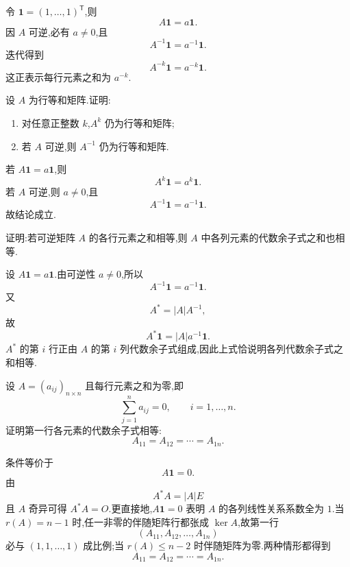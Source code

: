 \begin{solution}
令 $\boldsymbol{1}=(1,\ldots,1)^{\mathsf T}$,则
\[
A\boldsymbol{1}=a\boldsymbol{1}.
\]
因 $A$ 可逆,必有 $a\neq0$,且
\[
A^{-1}\boldsymbol{1}=a^{-1}\boldsymbol{1}.
\]
迭代得到
\[
A^{-k}\boldsymbol{1}=a^{-k}\boldsymbol{1}.
\]
这正表示每行元素之和为 $a^{-k}$.
\end{solution}

\begin{example}
设 $A$ 为行等和矩阵.证明:
\begin{enumerate}
  \item 对任意正整数 $k$,$A^k$ 仍为行等和矩阵;
  \item 若 $A$ 可逆,则 $A^{-1}$ 仍为行等和矩阵.
\end{enumerate}
\end{example}
\exampleblank

\begin{solution}
若 $A\boldsymbol{1}=a\boldsymbol{1}$,则
\[
A^k\boldsymbol{1}=a^k\boldsymbol{1}.
\]
若 $A$ 可逆,则 $a\neq0$,且
\[
A^{-1}\boldsymbol{1}=a^{-1}\boldsymbol{1}.
\]
故结论成立.
\end{solution}

\begin{example}
证明:若可逆矩阵 $A$ 的各行元素之和相等,则 $A$ 中各列元素的代数余子式之和也相等.
\end{example}
\exampleblank

\begin{solution}
设 $A\boldsymbol{1}=a\boldsymbol{1}$.由可逆性 $a\neq0$,所以
\[
A^{-1}\boldsymbol{1}=a^{-1}\boldsymbol{1}.
\]
又
\[
A^*=|A|A^{-1},
\]
故
\[
A^*\boldsymbol{1}=|A|a^{-1}\boldsymbol{1}.
\]
$A^*$ 的第 $i$ 行正由 $A$ 的第 $i$ 列代数余子式组成,因此上式恰说明各列代数余子式之和相等.
\end{solution}

\begin{example}
设 $A=(a_{ij})_{n\times n}$ 且每行元素之和为零,即
\[
\displaystyle\sum\limits_{j=1}^na_{ij}=0,
\qquad i=1,\ldots,n.
\]
证明第一行各元素的代数余子式相等:
\[
A_{11}=A_{12}=\cdots=A_{1n}.
\]
\end{example}
\exampleblank

\begin{solution}
条件等价于
\[
A\boldsymbol{1}=0.
\]
由
\[
A^*A=|A|E
\]
且 $A$ 奇异可得 $A^*A=O$.更直接地,$A\boldsymbol{1}=0$ 表明 $A$ 的各列线性关系系数全为 $1$.当 $r(A)=n-1$ 时,任一非零的伴随矩阵行都张成 $\ker A$,故第一行
\[
(A_{11},A_{12},\ldots,A_{1n})
\]
必与 $(1,1,\ldots,1)$ 成比例;当 $r(A)\leq n-2$ 时伴随矩阵为零.两种情形都得到
\[
\boxed{A_{11}=A_{12}=\cdots=A_{1n}}.
\]
\end{solution}


